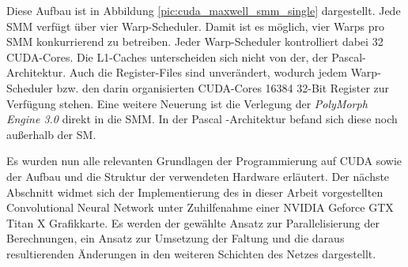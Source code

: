 \documentclass[../main.tex]{subfiles}
\begin{document}
Diese Aufbau ist in Abbildung \ref{pic:cuda_maxwell_smm_single} dargestellt. Jede SMM verfügt über vier Warp-Scheduler. Damit ist es möglich, vier Warps pro SMM konkurrierend zu betreiben. Jeder Warp-Scheduler kontrolliert dabei 32 CUDA-Cores. Die L1-Caches unterscheiden sich nicht von der, der Pascal-Architektur. Auch die Register-Files sind unverändert, wodurch jedem Warp-Scheduler bzw. den darin organisierten CUDA-Cores 16384 32-Bit Register zur Verfügung stehen. Eine weitere Neuerung ist die Verlegung der \emph{PolyMorph Engine 3.0} direkt in die SMM. In der Pascal -Architektur befand sich diese noch außerhalb der SM. \par 
Es wurden nun alle relevanten Grundlagen der Programmierung auf CUDA sowie der Aufbau und die Struktur der verwendeten Hardware erläutert. Der nächste Abschnitt widmet sich der Implementierung des in dieser Arbeit vorgestellten Convolutional Neural Network unter Zuhilfenahme einer NVIDIA Geforce GTX Titan X Grafikkarte. Es werden der gewählte Ansatz zur Parallelisierung der Berechnungen, ein Ansatz zur Umsetzung der Faltung und die daraus resultierenden Änderungen in den weiteren Schichten des Netzes dargestellt. \par 
\end{document}
